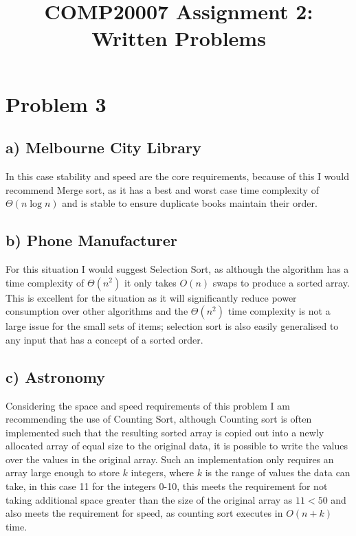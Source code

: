 \documentclass{article}
\title{\vspace{-1cm}COMP20007 Assignment 2: Written Problems\vspace{-1cm}}
\date{}
\author{}
\begin{document}
\maketitle
\thispagestyle{fancy}
\section*{Problem 3}
\subsection*{a) Melbourne City Library}
In this case stability and speed are the core requirements, because of this I would recommend Merge sort, as it has a best and worst case time complexity of $\Theta(n\log n)$ and is stable to ensure duplicate books maintain their order.
\subsection*{b) Phone Manufacturer}
For this situation I would suggest Selection Sort, as although the algorithm has a time complexity of $\Theta(n^2)$ it only takes $O(n)$ swaps to produce a sorted array. This is excellent for the situation as it will significantly reduce power consumption over other algorithms and the $\Theta(n^2)$ time complexity is not a large issue for the small sets of items; selection sort is also easily generalised to any input that has a concept of a sorted order.
\subsection*{c) Astronomy}
Considering the space and speed requirements of this problem I am recommending the use of Counting Sort, although Counting sort is often implemented such that the resulting sorted array is copied out into a newly allocated array of equal size to the original data, it is possible to write the values over the values in the original array. Such an implementation only requires an array large enough to store $k$ integers, where $k$ is the range of values the data can take, in this case 11 for the integers 0-10, this meets the requirement for not taking additional space greater than the size of the original array as $11<50$ and also meets the requirement for speed, as counting sort executes in $O(n+k)$ time.
\end{document}
